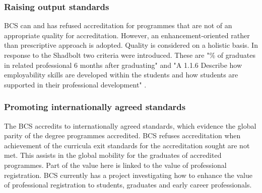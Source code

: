 \documentclass[sigconf]{acmart}
\begin{document}
\subsubsection{Raising output standards}
\begin{comment}
version 1
BCS refuses accreditation for programmes that do not meet the expected output standards or when achievement of the curricula exit standards for the accreditation sought are not met. "\% of graduates in related professional 6 months after graduating" \cite[p8]{BCS2019b} is the employability output standard applied to each programme. Departments are also requested to  "A 1.1.6 Describe how employability skills are developed within the students and how students are supported in their professional development" \cite [p3]{BCS2019b}. Both these criteria were introduced in response to Shadbolt.
\end{comment}
\begin{comment}
version 2
BCS refuses accreditation for programmes that do not meet the expected output standards. "\% of graduates in related professional 6 months after graduating" \cite[p8]{BCS2019b} is the employability output standard applied to each programme. Departments are also requested to  "A 1.1.6 Describe how employability skills are developed within the students and how students are supported in their professional development" \cite [p3]{BCS2019b}. Both these criteria were introduced in response to Shadbolt.
\end{comment}
BCS can and has refused accreditation for programmes that are not of an appropriate quality for accreditation. However, an enhancement-oriented rather than prescriptive approach is adopted. Quality is considered on a holistic basis. In response to the Shadbolt two criteria were introduced. These are "\% of graduates in related professional 6 months after graduating"  \cite [p8]{BCS2019b} and "A 1.1.6 Describe how employability skills are developed within the students and how students are supported in their professional development" \cite [p3]{BCS2019b}.
\subsubsection{Promoting internationally agreed standards}
The BCS accredits to internationally agreed standards, which evidence the global parity of the degree programmes accredited. BCS refuses accreditation when achievement of the curricula exit standards for the accreditation sought are not met.  This assists in the global mobility for the graduates of accredited programmes. Part of the value here is linked to the value of professional registration. BCS currently has a project investigating how to enhance the value of professional registration to students, graduates and early career professionals.
\end{document}
